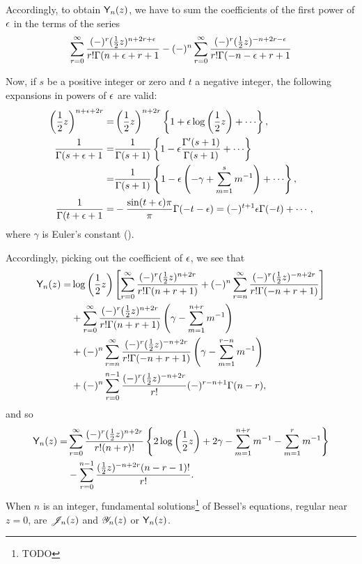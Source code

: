 \documentclass{book}
\begin{document}
    Accordingly, to obtain $\mathsf{Y}_n(z)$, we have to sum the
    coefficients of the first power of $\epsilon$ in the terms of the
    series
    $$
    \sum_{r=0}^{\infty}
    \frac{(-)^r (\frac{1}{2} z)^{n+2r+\epsilon}}{r! \Gamma(n+\epsilon+r+1}
    -
    (-)^n
    \sum_{r=0}^{\infty}
    \frac{(-)^r (\frac{1}{2} z)^{-n+2r -\epsilon}}{r! \Gamma(-n-\epsilon+r+1}
    $$

    Now, if $s$ be a positive integer or zero and $t$ a negative
    integer, the following expansions in powers of $\epsilon$ are valid:
    \begin{align*}
      \theparen{\half z}^{n+\eps+2r}
      =& \theparen{\half z}^{n+2r}
      \thebrace{1 + \eps\log\theparen{\half z} + \cdots},
      \\
      \frac{1}{\Gamma(s+\eps+1}
      =&
      \frac{1}{\Gamma(s+1)}
      \thebrace{
        1 - \eps \frac{\Gamma'(s+1)}{\Gamma(s+1)} + \cdots
      }
      \\
      =&
      \frac{1}{\Gamma(s+1)}
      \thebrace{
        1 - \eps\theparen{-\gamma + \sum_{m=1}^{s} m^{-1}} + \cdots
      },
      \\
      \frac{1}{\Gamma(t+\eps+1}
      =&
      - \frac{\sin(t+\eps)\pi}{\pi}
      \Gamma(-t-\eps)
      =
      (-)^{t+1} \eps \Gamma(-t) + \cdots,
    \end{align*}
    where $\gamma$ is Euler's constant ().

    Accordingly, picking out the coefficient of $\epsilon$, we see that
    \begin{align*}
    \mathsf{Y}_n(z)
    =&
    \log\left( \frac{1}{2} z \right)
    \left[ 
      \sum_{r=0}^{\infty}
      \frac{(-)^r (\frac{1}{2} z)^{n+2r}}{r! \Gamma(n+r+1)}
      + (-)^n \sum_{r=n}^{\infty} \frac{(-)^r (\frac{1}{2} z)^{-n+2r}}{r! \Gamma(-n+r+1)}
     \right]
    \\
    &
    + \sum_{r=0}^{\infty}
    \frac{(-)^r (\frac{1}{2} z)^{n+2r}}{r! \Gamma(n+r+1)}
    \left( \gamma - \sum_{m=1}^{n+r} m^{-1} \right)
    \\
    &
    + (-)^n
    \sum_{r=n}^{\infty}
    \frac{(-)^r (\frac{1}{2} z)^{-n+2r}}{r! \Gamma(-n+r+1)}
    \left( \gamma - \sum_{m=1}^{r-n} m^{-1} \right)
    \\
    &
    + (-)^n
    \sum_{r=0}^{n-1}
    \frac{ (-)^r (\frac{1}{2} z)^{-n+2r}}{r!}
    (-)^{r-n+1} \Gamma(n-r),
  \end{align*}
  and so
  \begin{align*}
    \mathsf{Y}_n(z)
    =&
    \sum_{r=0}^{\infty}
    \frac{(-)^r (\frac{1}{2} z)^{n+2r}}{r!(n+r)!}
    \left\{ 
      2 \log\left( \frac{1}{2} z \right)
      + 2\gamma
      - \sum_{m=1}^{n+r} m^{-1}
      - \sum_{m=1}^r m^{-1}
     \right\}
    \\
    & - \sum_{r=0}^{n-1} \frac{(\frac{1}{2} z)^{-n+2r} (n-r-1)!}{r!}.
  \end{align*}
  When $n$ is an integer, fundamental solutions\footnote{TODO} of
  Bessel's equations, regular near $z=0$, are $\mathscr{J}_n(z)$ and $\mathscr{Y}_n(z)$ or
  $\mathsf{Y}_n(z)$.
\end{document}
